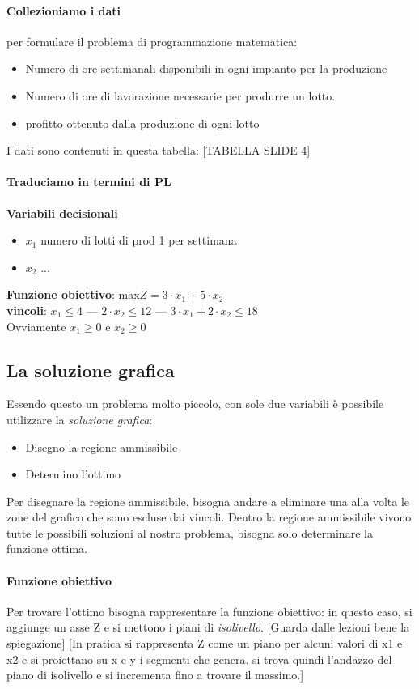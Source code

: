 \documentclass[12pt, a4paper, openany]{book}
\begin{document}
\paragraph*{Collezioniamo i dati} per formulare il problema di programmazione matematica:
\begin{itemize}
    \item Numero di ore settimanali disponibili in ogni impianto per la produzione
    \item Numero di ore di lavorazione necessarie per produrre un lotto.
    \item profitto ottenuto dalla produzione di ogni lotto
\end{itemize}
I dati sono contenuti in questa tabella: [TABELLA SLIDE 4]

\paragraph*{Traduciamo in termini di PL}
\textbf{Variabili decisionali}
\begin{itemize}
    \item $x_1$ numero di lotti di prod 1 per settimana
    \item $x_2$ ...
\end{itemize}
\textbf{Funzione obiettivo}: max$Z = 3 \cdot x_1 + 5 \cdot x_2$
\\\textbf{vincoli}: $x_1\leq 4$ --- $2 \cdot x_2 \leq 12$ --- $3\cdot x_1 + 2\cdot x_2 \leq 18$
\\Ovviamente $x_1 \geq 0$ e $x_2 \geq 0$

\subsection*{La soluzione grafica} Essendo questo un problema molto piccolo, con sole due variabili è possibile
utilizzare la \emph{soluzione grafica}:
\begin{itemize}
    \item Disegno la regione ammissibile
    \item Determino l'ottimo
\end{itemize} 
Per disegnare la regione ammissibile, bisogna andare a eliminare una alla volta le zone del grafico che sono escluse dai vincoli.
Dentro la regione ammissibile vivono tutte le possibili soluzioni al nostro problema, bisogna solo determinare la funzione ottima.

\paragraph*{Funzione obiettivo}
Per trovare l'ottimo bisogna rappresentare la funzione obiettivo:
in questo caso, si aggiunge un asse Z e si mettono i piani di \emph{isolivello}.
[Guarda dalle lezioni bene la spiegazione] [In pratica si rappresenta Z come un piano per alcuni valori di x1 e x2 e si proiettano su x e y i segmenti che genera.
si trova quindi l'andazzo del piano di isolivello e si incrementa fino a trovare il massimo.]
\end{document}
